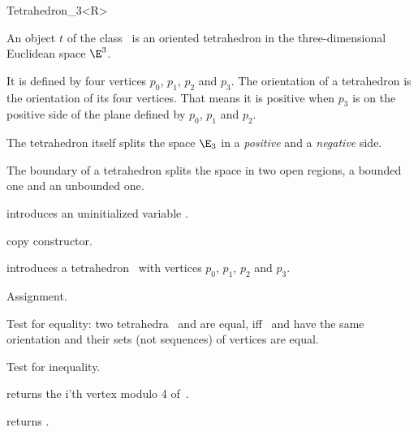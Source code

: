\begin{ccRefClass} {Tetrahedron_3<R>}

\ccDefinition  An object $t$ of the class \ccRefName\ is an oriented
tetrahedron in the three-dimensional Euclidean space $\E^3$. 

It is defined by four vertices $p_0$, $p_1$, $p_2$ and $p_3$.
The orientation of a tetrahedron is the orientation of its four 
vertices. That means it is positive when $p_3$ is on the positive
side of the plane defined by $p_0$, $p_1$ and $p_2$.

The tetrahedron itself splits the space $\E_3$ in a {\em positive} and
a {\em negative} side.
 
The boundary of a tetrahedron splits the space in two open regions, a
bounded one and an unbounded one.

\ccCreation
{}


\ccHidden {}
             {introduces an uninitialized variable \ccVar.}

\ccHidden {}
 	    {copy constructor.}


            {introduces a tetrahedron \ccVar\ with vertices $p_0$, $p_1$, $p_2$ and $p_3$.}


\ccOperations

\ccHidden {}
        {Assignment.}

       {Test for equality: two tetrahedra \ccVar\ and  are equal, 
        iff \ccVar\ and  have the same orientation and 
        their sets (not sequences) of vertices are equal.}

       {Test for inequality.}

       {returns the i'th vertex modulo 4  of~\ccVar.}

       {returns .}


\end{ccRefClass}
